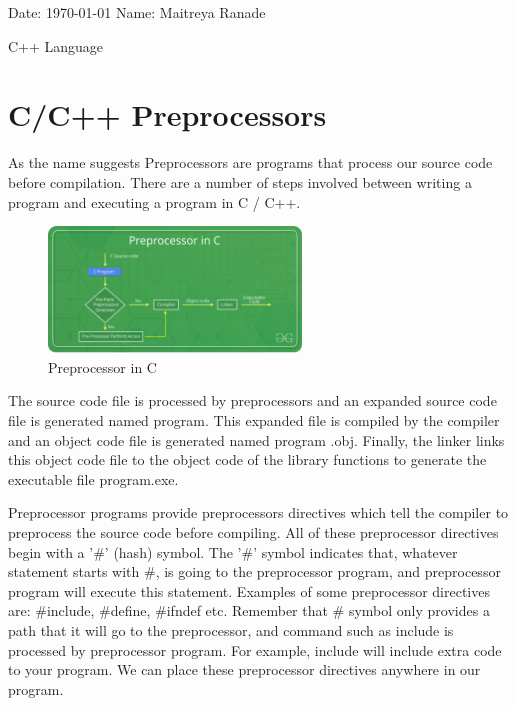 \documentclass[12pt, a4paper]{article}
\begin{document}
	\onehalfspacing
	Date: \today{} \hfill{} Name: Maitreya Ranade
	\begin{center}
		\vspace*{\fill}
		{\LARGE C++ Language} \\
		\vspace*{\fill}
	\end{center}
	
	\pagebreak
	\singlespacing
	\tableofcontents
	\pagebreak

    \section{C/C++ Preprocessors}

    As the name suggests Preprocessors are programs that process our source code before compilation. There are a number of steps involved between writing a program and executing a program in C / C++. 


    \begin{figure}[H]
        \begin{center}
            \includegraphics[width=0.6\textwidth]{images/Cpreprocessor.png}
            \caption{Preprocessor in C}
            \label{Cpreprocessor}
        \end{center}
    \end{figure}

    The source code file is processed by preprocessors and an expanded source code file is generated named program. This expanded file is compiled by the compiler and an object code file is generated named program .obj. Finally, the linker links this object code file to the object code of the library functions to generate the executable file program.exe.

    \par Preprocessor programs provide preprocessors directives which tell the compiler to preprocess the source code before compiling. All of these preprocessor directives begin with a '\#' (hash) symbol. The '\#' symbol indicates that, whatever statement starts with \#, is going to the preprocessor program, and preprocessor program will execute this statement. Examples of some preprocessor directives are: \#include, \#define, \#ifndef etc. Remember that \# symbol only provides a path that it will go to the preprocessor, and command such as include is processed by preprocessor program. For example, include will include extra code to your program. We can place these preprocessor directives anywhere in our program. 
\end{document}
